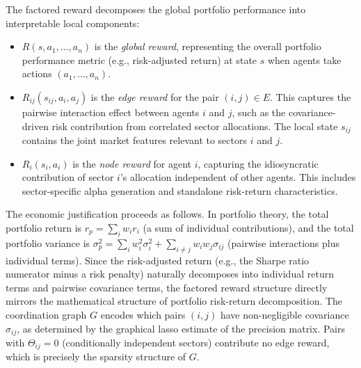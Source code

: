 \documentclass[12pt,a4paper,oneside]{report}
\theoremstyle{definition}
\theoremstyle{remark}
\begin{document}
\medskip
\noindent The factored reward decomposes the global portfolio performance into interpretable local components:
\begin{itemize}[leftmargin=2em]
  \item $R(s, a_1, \dots, a_n)$ is the \emph{global reward}, representing the overall portfolio performance metric (e.g., risk-adjusted return) at state $s$ when agents take actions $(a_1, \ldots, a_n)$.
  \item $R_{ij}(s_{ij}, a_i, a_j)$ is the \emph{edge reward} for the pair $(i,j) \in E$. This captures the pairwise interaction effect between agents $i$ and $j$, such as the covariance-driven risk contribution from correlated sector allocations. The local state $s_{ij}$ contains the joint market features relevant to sectors $i$ and $j$.
  \item $R_i(s_i, a_i)$ is the \emph{node reward} for agent $i$, capturing the idiosyncratic contribution of sector $i$'s allocation independent of other agents. This includes sector-specific alpha generation and standalone risk-return characteristics.
\end{itemize}

\noindent The economic justification proceeds as follows. In portfolio theory, the total portfolio return is $r_p = \sum_i w_i r_i$ (a sum of individual contributions), and the total portfolio variance is $\sigma_p^2 = \sum_i w_i^2 \sigma_i^2 + \sum_{i \neq j} w_i w_j \sigma_{ij}$ (pairwise interactions plus individual terms). Since the risk-adjusted return (e.g., the Sharpe ratio numerator minus a risk penalty) naturally decomposes into individual return terms and pairwise covariance terms, the factored reward structure directly mirrors the mathematical structure of portfolio risk-return decomposition. The coordination graph $G$ encodes which pairs $(i,j)$ have non-negligible covariance $\sigma_{ij}$, as determined by the graphical lasso estimate of the precision matrix. Pairs with $\Theta_{ij} = 0$ (conditionally independent sectors) contribute no edge reward, which is precisely the sparsity structure of $G$.
\end{document}
